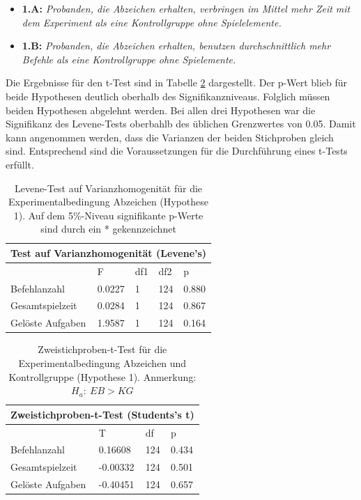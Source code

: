\begin{itemize}
    \item \textbf{1.A:} \textit{Probanden, die Abzeichen erhalten, verbringen im Mittel mehr Zeit mit dem Experiment als eine Kontrollgruppe ohne Spielelemente.}
    \item \textbf{1.B:} \textit{Probanden, die Abzeichen erhalten, benutzen durchschnittlich mehr Befehle als eine Kontrollgruppe ohne Spielemente.} 
\end{itemize}

Die Ergebnisse für den t-Test sind in Tabelle \ref{ttest_hypo_1} dargestellt. Der p-Wert blieb für beide Hypothesen deutlich oberhalb des Signifikanzniveaus. Folglich müssen beiden Hypothesen abgelehnt werden. Bei allen drei Hypothesen war die Signifikanz des Levene-Tests oberbahlb des üblichen Grenzwertes von 0.05. Damit kann angenommen werden, dass die Varianzen der beiden Stichproben gleich sind. Entsprechend sind die Voraussetzungen für die Durchführung eines t-Tests erfüllt.

\begin{table}[htbp]
\centering
\begin{tabular}{ |p{4cm}||p{2.0cm}|p{2.0cm}|p{2.0cm}|p{2.0cm}| }
 \hline
 \multicolumn{5}{|c|}{Test auf Varianzhomogenität (Levene's)} \\
 \hline
 & F & df1 &df2 &p \\
 \hline
  Befehlanzahl      & 0.0227    & 1 &   124 & 0.880\\
  Gesamtspielzeit   & 0.0284    & 1 &   124 & 0.867\\
  Gelöste Aufgaben  & 1.9587    & 1 &   124 & 0.164\\
 \hline
\end{tabular}
\caption{Levene-Test auf Varianzhomogenität für die Experimentalbedingung Abzeichen (Hypothese 1). Auf dem 5\%-Niveau signifikante p-Werte sind durch ein * gekennzeichnet}
\label{levene_hypo_1}
\end{table}
\begin{table}[htbp]
\centering
\begin{tabular}{ |p{4cm}||p{2.0cm}|p{2.0cm}|p{2.0cm}| }
 \hline
 \multicolumn{4}{|c|}{Zweistichproben-t-Test (Students's t)} \\
 \hline
 & T &df & p \\
 \hline
  Befehlanzahl       & 0.16608  &   124 & 0.434\\
  Gesamtspielzeit    & -0.00332 &   124 & 0.501\\
  Gelöste Aufgaben   & -0.40451 &   124 & 0.657\\
 \hline
\end{tabular}
\caption{Zweistichproben-t-Test für die Experimentalbedingung Abzeichen und Kontrollgruppe (Hypothese 1). Anmerkung: $H_a:\: EB > KG$}
\label{ttest_hypo_1}
\end{table}



